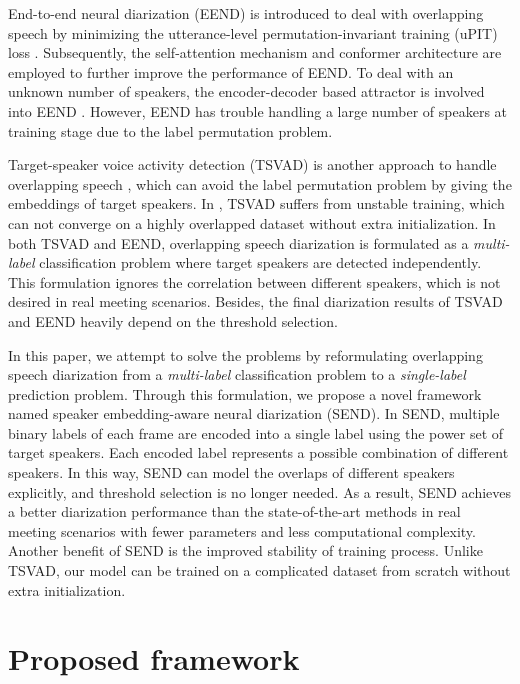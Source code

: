 \documentclass[a4paper]{article}
\begin{document}
End-to-end neural diarization (EEND) \cite{FujitaKHNW19} is introduced to deal with overlapping speech by minimizing the utterance-level permutation-invariant training (uPIT) loss \cite{KolbaekYTJ17}.
Subsequently, the self-attention mechanism \cite{FujitaKHXNW19} and conformer architecture \cite{Liu2021Conformer} are employed to further improve the performance of EEND.
To deal with an unknown number of speakers, the encoder-decoder based attractor is involved into EEND \cite{HoriguchiF0XN20}.
However, EEND has trouble handling a large number of speakers at training stage due to the label permutation problem.

Target-speaker voice activity detection (TSVAD) is another approach to handle overlapping speech \cite{MedennikovKPKKS20}, which can avoid the label permutation problem by giving the embeddings of target speakers. In \cite{Weiqing2022}, TSVAD suffers from unstable training, which can not converge on a highly overlapped dataset without extra initialization.
In both TSVAD and EEND, overlapping speech diarization is formulated as a \emph{multi-label} classification problem where target speakers are detected independently.
This formulation ignores the correlation between different speakers, which is not desired in real meeting scenarios.
Besides, the final diarization results of TSVAD and EEND heavily depend on the threshold selection.

In this paper, we attempt to solve the problems by reformulating overlapping speech diarization from a \emph{multi-label} classification problem to a \emph{single-label} prediction problem.
Through this formulation, we propose a novel framework named speaker embedding-aware neural diarization (SEND).
In SEND, multiple binary labels of each frame are encoded into a single label using the power set of target speakers. Each encoded label represents a possible combination of different speakers. 
In this way, SEND can model the overlaps of different speakers explicitly, and threshold selection is no longer needed.
As a result, SEND achieves a better diarization performance than the state-of-the-art methods in real meeting scenarios with fewer parameters and less computational complexity.
Another benefit of SEND is the improved stability of training process.
Unlike TSVAD, our model can be trained on a complicated dataset from scratch without extra initialization.

\section{Proposed framework}
\end{document}
